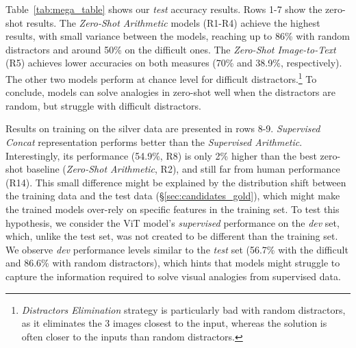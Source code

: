 \documentclass[letterpaper]{article} \usepackage{aaai23}  \usepackage{times}  \usepackage{helvet}  \usepackage{courier}  \usepackage[hyphens]{url}  \usepackage{graphicx} \urlstyle{rm} \def\UrlFont{\rm}  \usepackage{natbib}  \usepackage{caption} \frenchspacing  \setlength{\pdfpagewidth}{8.5in}  \setlength{\pdfpageheight}{11in}  \usepackage{algorithm}
\newcommand{\zeroshot}[0]{\emph{Zero-Shot Arithmetic}}
\newcommand{\trainedarithmetic}[0]{\emph{Supervised Arithmetic}}
\newcommand{\trainedconcat}[0]{\emph{Supervised Concat}}
\begin{document}
Table~\ref{tab:mega_table} shows our \textit{test} accuracy results.
Rows 1-7 show the zero-shot results.
The \zeroshot{} models (R1-R4) achieve the highest results, with small variance between the models, reaching up to 86\% with random distractors and around 50\% on the difficult ones. The \emph{Zero-Shot Image-to-Text} (R5) achieves lower accuracies on both measures (70\% and 38.9\%, respectively). The other two models perform at chance level for difficult distractors.\footnote{\emph{Distractors Elimination} strategy is particularly bad with random distractors, as it eliminates the 3 images closest to the input, whereas the solution is often closer to the inputs than random distractors.} To conclude, models can solve analogies in zero-shot well when the distractors are random, but struggle with difficult distractors.

Results on training on the silver data are presented in rows 8-9. \trainedconcat{} representation performs better than the \trainedarithmetic{}. Interestingly, its performance (54.9\%, R8) is only 2\% higher than the best zero-shot baseline (\zeroshot{}, R2), and still far from human performance (R14). This small difference might be explained by the distribution shift between the training data and the test data (\S\ref{sec:candidates_gold}), which might make the trained models over-rely on specific features in the training set. To test this hypothesis, we consider the ViT model's \textit{supervised} performance on the  \textit{dev} set, which, unlike the test set, was not created to be different than the training set. We observe \textit{dev} performance levels similar to the \textit{test} set (56.7\% with the difficult and 86.6\% with random distractors), which hints 
that models might struggle to capture the information required to solve visual analogies from supervised data.
\end{document}
